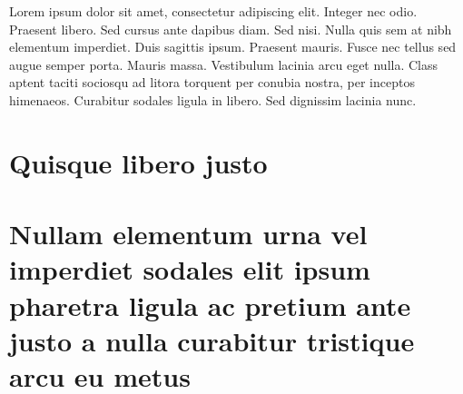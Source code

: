 Lorem ipsum dolor sit amet, consectetur adipiscing elit. Integer nec odio. Praesent libero. Sed cursus ante dapibus diam. Sed nisi. Nulla quis sem at nibh elementum imperdiet. Duis sagittis ipsum. Praesent mauris. Fusce nec tellus sed augue semper porta. Mauris massa. Vestibulum lacinia arcu eget nulla. Class aptent taciti sociosqu ad litora torquent per conubia nostra, per inceptos himenaeos. Curabitur sodales ligula in libero. Sed dignissim lacinia nunc.


\chapter{Quisque libero justo}

\lipsum[50]


\chapter{Nullam elementum urna vel imperdiet sodales elit ipsum pharetra ligula ac pretium ante justo a nulla curabitur tristique arcu eu metus}

\lipsum[54-56]